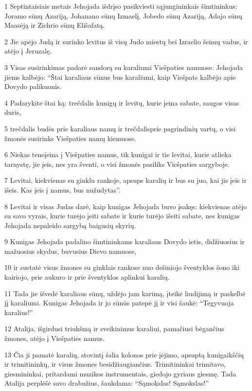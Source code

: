 \par 1 Septintaisiais metais Jehojada išdrįso pasikviesti sąjungininkais šimtininkus: Joramo sūnų Azariją, Johanano sūnų Izmaelį, Jobedo sūnų Azariją, Adajo sūnų Maasėją ir Zichrio sūnų Elišafatą. 
\par 2 Jie apėjo Judą ir surinko levitus iš visų Judo miestų bei Izraelio šeimų vadus, ir atėjo į Jeruzalę. 
\par 3 Visas susirinkimas padarė sandorą su karaliumi Viešpaties namuose. Jehojada jiems kalbėjo: “Štai karaliaus sūnus bus karaliumi, kaip Viešpats kalbėjo apie Dovydo palikuonis. 
\par 4 Padarykite štai ką: trečdalis kunigų ir levitų, kurie įeina sabate, saugos visas duris, 
\par 5 trečdalis budės prie karaliaus namų ir trečdalis­prie pagrindinių vartų, o visi žmonės susirinks Viešpaties namų kiemuose. 
\par 6 Niekas teneįeina į Viešpaties namus, tik kunigai ir tie levitai, kurie atlieka tarnystę, jie įeis, nes yra šventi, o visi žmonės pasiliks Viešpaties sargyboje. 
\par 7 Levitai, kiekvienas su ginklu rankoje, apsups karalių ir bus su juo, kai jis įeis ir išeis. Kas įeis į namus, bus nužudytas”. 
\par 8 Levitai ir visas Judas darė, kaip kunigas Jehojada buvo įsakęs: kiekvienas atėjo su savo vyrais, kurie turėjo įeiti sabate ir kurie turėjo išeiti sabate, nes kunigas Jehojada nepaleido sargybą baigusių skyrių. 
\par 9 Kunigas Jehojada padalino šimtininkams karaliaus Dovydo ietis, didžiuosius ir mažuosius skydus, buvusius Dievo namuose, 
\par 10 ir sustatė visus žmones su ginklais rankose nuo dešiniojo šventyklos šono iki kairiojo, prie aukuro ir prie šventyklos aplinkui karalių. 
\par 11 Tada jie išvedė karaliaus sūnų, uždėjo jam karūną, įteikė liudijimą ir paskelbė jį karaliumi. Kunigas Jehojada ir jo sūnūs patepė jį ir visi šaukė: “Tegyvuoja karalius!” 
\par 12 Atalija, išgirdusi triukšmą ir sveikinimus karaliui, pamačiusi bėgančius žmones, atėjo į Viešpaties namus. 
\par 13 Čia ji pamatė karalių, stovintį šalia kolonos prie įėjimo, apsuptą kunigaikščių ir trimitininkų, ir visus žmones besidžiaugiančius. Trimitininkai trimitavo, giesmininkai, pritardami muzikos instrumentais, giedojo gyriaus giesmę. Tada Atalija perplėšė savo drabužius, šaukdama: “Sąmokslas! Sąmokslas!” 
